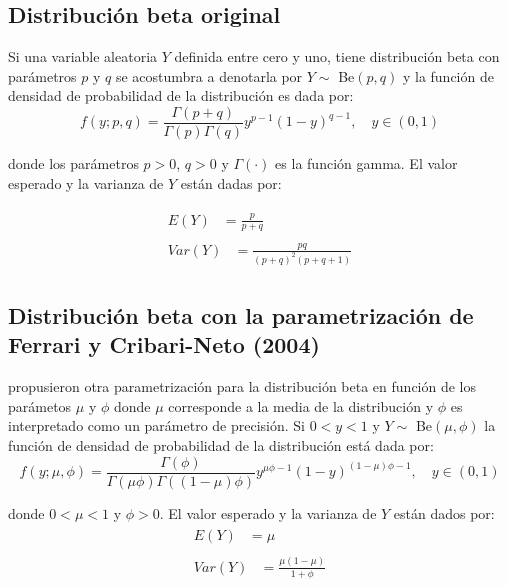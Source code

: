 \subsection{Distribuci\'{o}n beta original}

Si una variable aleatoria $Y$ definida entre cero y uno, tiene distribuci\'{o}n beta con par\'{a}metros $p$ y $q$ se acostumbra a denotarla por $Y \sim$ Be$(p,q)$ y la funci\'{o}n de densidad de probabilidad de la distribuci\'{o}n es dada por:
\begin{equation}
f(y;p,q)=\frac{\Gamma(p+q)}{\Gamma(p)\Gamma(q)}y^{p-1}(1-y)^{q-1}, \quad y \in (0, 1)
\end{equation}

donde los par\'{a}metros $p>0$, $q>0$ y $\Gamma(\cdot)$ es la funci\'{o}n gamma. El valor esperado y la varianza de $Y$ est\'{a}n dadas por:

\begin{align}
\begin{split}
	E(Y) &= \frac{p}{p+q} 
\end{split} \label{E_Origin} \\
\begin{split}
	Var(Y) &= \frac{pq}{(p+q)^2(p+q+1)}
\end{split} \label{V_Origin}
\end{align}


\subsection{Distribuci\'{o}n beta con la parametrizaci\'{o}n de Ferrari y Cribari-Neto (2004)}


\cite{Ferrari2} propusieron otra parametrizaci\'{o}n para la distribuci\'{o}n beta en funci\'{o}n de los par\'{a}metos $\mu$ y $\phi$ donde $\mu$ corresponde a la media de la distribuci\'{o}n y $\phi$ es interpretado como un par\'{a}metro de precisi\'{o}n. Si $0<y<1$ y $Y \sim$ Be$(\mu,\phi)$ la funci\'{o}n de densidad de probabilidad de la distribuci\'{o}n est\'{a} dada por:
\begin{equation}
f(y;\mu,\phi)=\frac{\Gamma(\phi)}{\Gamma(\mu\phi)\Gamma((1-\mu)\phi)}y^{\mu\phi-1}(1-y)^{(1-\mu)\phi-1}, \quad y \in (0, 1)
\end{equation}

donde $0<\mu<1$ y $\phi>0$. El valor esperado y la varianza de $Y$ est\'{a}n dados por:
\begin{align}
\begin{split}
	E(Y) &= \mu 
\end{split} \label{E_FC} \\
\begin{split}
	Var(Y) &= \frac{\mu(1-\mu)}{1+\phi}
\end{split} \label{V_FC}
\end{align}

